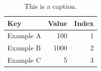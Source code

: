 \begin{table}[t!]
\centering
{\small
\begin{tabular}{l|r|r}
Key & Value & Index  \\
\hline
Example A & 100 & 1 \\
Example B & 1000 & 2 \\
Example C & 5 & 3  \\
\hline
\end{tabular}}
\caption{This is a caption.}
\label{table:example}
\end{table}